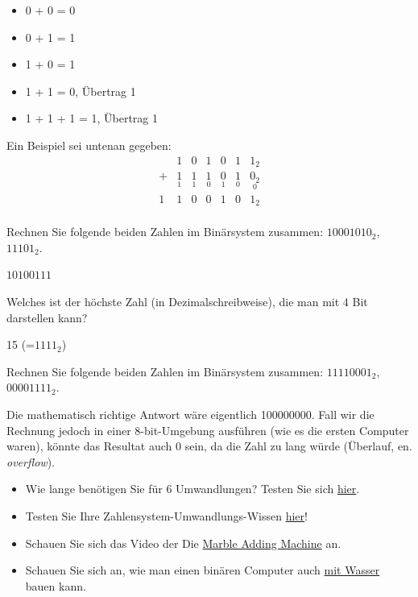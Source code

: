 \begin{itemize}
\item 0 + 0 = 0 
\item 0 + 1 = 1 
\item 1 + 0 = 1 
\item 1 + 1 = 0, Übertrag 1
\item 1 + 1 + 1 = 1, Übertrag 1
\end{itemize} 

Ein Beispiel sei untenan gegeben:
\[
\begin{array}{ccccccc}
  & 1 & 0 & 1 & 0 & 1 & 1_2 \\
+ & \underset{1}{1} & \underset{1}{1} & \underset{0}{1} & \underset{1}{0} & \underset{0}{1} & \underset{0}{0_2} \\
\hline
1 & 1 & 0 & 0 & 1 & 0 & 1_2 \\
\end{array}
\]

\begin{myexercise}
Rechnen Sie folgende beiden Zahlen im Binärsystem zusammen: $10001010_2$, $11101_2$.
\begin{myanswer}
$10100111$
\end{myanswer}
\end{myexercise}

\begin{myexercise}
Welches ist der höchste Zahl (in Dezimalschreibweise), die man mit 4 Bit darstellen kann? 
\begin{myanswer}
15 (=$1111_2$)
\end{myanswer}
\end{myexercise}

\begin{mychallenge}
Rechnen Sie folgende beiden Zahlen im Binärsystem zusammen: $11110001_2$, $00001111_2$.
\begin{myanswer}
Die mathematisch richtige Antwort wäre eigentlich 100000000. Fall wir die Rechnung jedoch in einer 8-bit-Umgebung ausführen (wie es die ersten Computer waren), könnte das Resultat auch 0 sein, da die Zahl zu lang würde (Überlauf, en. \textit{overflow}).
\end{myanswer}
\end{mychallenge}

\begin{mychallenge}
\begin{itemize}
\item Wie lange benötigen Sie für 6 Umwandlungen? Testen Sie sich \href{https://oinf.ch/interactive/basiswechsel-10-zu-2/}{hier}.
\item Testen Sie Ihre Zahlensystem-Umwandlungs-Wissen \href{https://oinf.ch/interactive/basiswechsel-10-zu-2/}{hier}!
\item Schauen Sie sich das Video der Die \href{https://www.youtube.com/watch?app=desktop&v=GcDshWmhF4A&embeds_referring_euri=https%3A%2F%2Fwww.yaplakal.com%2Fforum28%2Fst%2F125%2Ftopic930979.html&feature=emb_imp_woyt}{Marble Adding Machine} an.
\item Schauen Sie sich an, wie man einen binären Computer auch \href{https://youtu.be/5wKz1e0ULcg?si=AiPXUniyfU15X11m}{mit Wasser} bauen kann.
\end{itemize}
\end{mychallenge}

